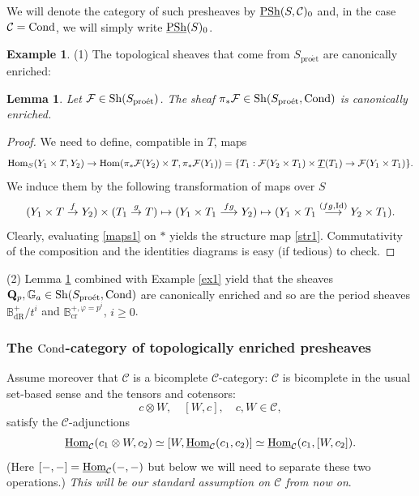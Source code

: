 \documentclass[10pt]{amsart}
\newtheorem{lemma}[equation]{Lemma}
\theoremstyle{definition}
\newtheorem{example}[equation]{Example}
\theoremstyle{remark}
\def\phi{\varphi}
\newcommand{\dr}{\operatorname{dR} }
\newcommand{\proeet}{\operatorname{pro\acute{e}t} }
\newcommand{\Hom}{{\rm{Hom}} }
\newcommand{\uHom}{\underline{{\rm{Hom}} }}
\newcommand{\crr}{\operatorname{cr} }
\newcommand{\sff}{{\mathcal{F}}}
\newcommand{\scc}{{\mathcal{C}}}
\numberwithin{equation}{section}
\def\Q{{\bf Q}} \def\Z{{\bf Z}}
\numberwithin{equation}{section}
\begin{document}
 We will denote the category of such presheaves by $\underline{\rm PSh}(S,\scc)_0$ and, in the case $\scc={\rm Cond}$, we will simply write $\underline{\rm PSh}(S)_0$. 
 \begin{example}

(1)  The topological sheaves that come from $S_{\proeet}$ are canonically  enriched:
\begin{lemma}\label{enriched1}Let $\sff\in {\rm Sh}(S_{\proeet})$. The sheaf $\pi_*\sff\in {\rm Sh}(S_{\proeet},{\rm Cond})$ is canonically enriched. 
\end{lemma}
\begin{proof}
We need to define,  compatible in $T$, maps
\begin{equation}\label{maps1}\Hom_S(Y_1\times T,Y_2)\to \Hom(\pi_*\sff(Y_2)\times T,\pi_*\sff(Y_1))=\{T_1: \sff(Y_2\times T_1)\times \underline{T}(T_1)\to \sff(Y_1\times T_1)\}.
\end{equation}
We induce them by the following transformation of maps over $S$
$$
(Y_1\times T\stackrel{f}{\to} Y_2)\times (T_1\stackrel{g}{\to} T)\mapsto (Y_1\times T_1\stackrel{fg}{\longrightarrow} Y_2)\mapsto (Y_1\times T_1\stackrel{(fg,{\rm Id})}{\longrightarrow} Y_2\times T_1).
$$
Clearly, evaluating \eqref{maps1} on $*$ yields the structure map \eqref{str1}. Commutativity of the composition and the identities diagrams \cite[(1.5), (1.6)]{Kelly} is easy (if tedious) to check. 
\end{proof}

(2) Lemma \ref{enriched1} combined with Example \ref{ex1} yield  that the sheaves $\Q_p, {\mathbb G}_a\in {\rm Sh}(S_{\proeet},{\rm Cond})$ are canonically enriched and so are the period sheaves ${\mathbb B}^+_{\dr}/t^i$ and ${\mathbb B}_{\crr}^{+,\phi=p^i}$, $i\geq 0$. 
\end{example}
\subsubsection{The ${\rm Cond}$-category of  topologically enriched  presheaves}\label{bicomplete} Assume moreover that  $\scc$ is a bicomplete  $\scc$-category:  $\scc$ is bicomplete in the usual set-based sense and the tensors and cotensors:
$$
c\otimes W,\quad [W,c], \quad c, W\in\scc,
$$
 satisfy the $\scc$-adjunctions
$$
\uHom_{\scc}(c_1\otimes W,c_2)\simeq [W,\uHom_{\scc}(c_1,c_2)]\simeq \uHom_{\scc}(c_1,[W,c_2]).
$$
(Here $[-,-]=\uHom_{\scc}(-,-)$ but below we will need to separate these two operations.)  
{\it This will be our standard assumption on $\scc$ from now on}.
\end{document}
